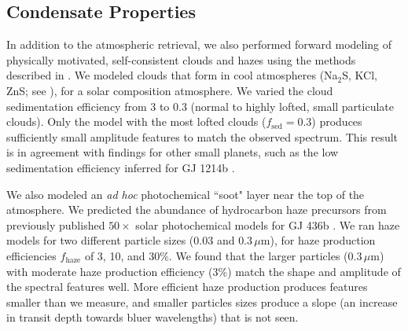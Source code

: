 \documentclass[twocolumn, trackchanges]{aastex61}
\begin{document}
\subsection{Condensate Properties}
In addition to the atmospheric retrieval, we also performed forward modeling of physically motivated, self-consistent clouds and hazes using the methods described in \cite{fortney08, morley15}.  We modeled clouds that form in cool atmospheres (Na$_2$S, KCl, ZnS; see \citealt{morley12}), for a solar composition atmosphere. We varied the cloud sedimentation efficiency from 3 to 0.3 (normal to highly lofted, small particulate clouds).  Only the model with the most lofted clouds ($f_\mathrm{sed} = 0.3$) produces sufficiently small amplitude features to match the observed spectrum.  This result is in agreement with findings for other small planets, such as the low sedimentation efficiency inferred for GJ 1214b \citep[$f_\mathrm{sed} < 0.1$][]{morley15}.  


We also modeled an \emph{ad hoc} photochemical ``soot" layer near the top of the atmosphere. We predicted the abundance of hydrocarbon haze precursors from previously published $50\times$ solar photochemical models for GJ 436b \citep{line11, morley17}. We ran haze models for two different particle sizes ($0.03$ and $0.3\,\mu$m), for haze production efficiencies $f_\mathrm{haze}$ of 3, 10, and 30\%. We found that the larger particles ($0.3\,\mu$m) with moderate haze production efficiency (3\%) match the shape and amplitude of the spectral features well. More efficient haze production produces features smaller than we measure, and smaller particles sizes produce a slope (an increase in transit depth towards bluer wavelengths) that is not seen.

\end{document}
